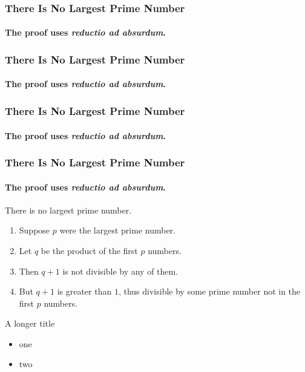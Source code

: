 \documentclass[sans, aspectratio=169]{beamer}
\begin{document}
\begin{frame} 
\frametitle{There Is No Largest Prime Number} 
\framesubtitle{The proof uses \textit{reductio ad absurdum}.} 

\end{frame}

\begin{frame} 
\frametitle{There Is No Largest Prime Number} 
\framesubtitle{The proof uses \textit{reductio ad absurdum}.} 

\end{frame}


\begin{frame} 
\frametitle{There Is No Largest Prime Number} 
\framesubtitle{The proof uses \textit{reductio ad absurdum}.} 

\end{frame}



\begin{frame} 
\frametitle{There Is No Largest Prime Number} 
\framesubtitle{The proof uses \textit{reductio ad absurdum}.} 
\begin{theorem}
There is no largest prime number. \end{theorem} 
\begin{enumerate} 
\item<1-| alert@1> Suppose $p$ were the largest prime number. 
\item<2-> Let $q$ be the product of the first $p$ numbers. 
\item<3-> Then $q+1$ is not divisible by any of them. 
\item<1-> But $q + 1$ is greater than $1$, thus divisible by some prime
number not in the first $p$ numbers.
\end{enumerate}
\end{frame}

\begin{frame}{A longer title}
\begin{itemize}
\item one
\item two
\end{itemize}
\end{frame}
\end{document}
